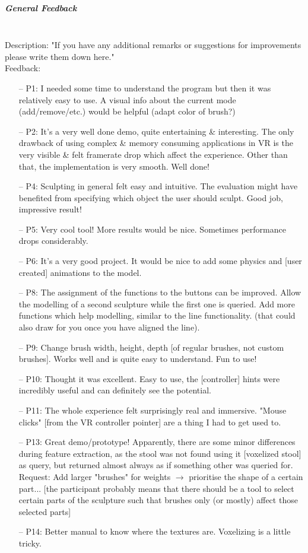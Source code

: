 \subparagraph{General Feedback} \hfill \\
Description: "If you have any additional remarks or suggestions for improvements please write them down here."\\
Feedback:
\begin{enumerate} \setlength\itemsep{-0.5em}
	\item[--] P1: I needed some time to understand the program but then it was relatively easy to use. A visual info about the current mode (add/remove/etc.) would be helpful (adapt color of brush?)
	\item[--] P2: It's a very well done demo, quite entertaining \& interesting. The only drawback of using complex \& memory consuming applications in VR is the very visible \& felt framerate drop which affect the experience. Other than that, the implementation is very smooth. Well done!
	\item[--] P4: Sculpting in general felt easy and intuitive. The evaluation might have benefited from specifying which object the user should sculpt. Good job, impressive result!
	\item[--] P5: Very cool tool! More results would be nice. Sometimes performance drops considerably.
	\item[--] P6: It's a very good project. It would be nice to add some physics and [user created] animations to the model.
	\item[--] P8: The assignment of the functions to the buttons can be improved. Allow the modelling of a second sculpture while the first one is queried. Add more functions which help modelling, similar to the line functionality. (that could also draw for you once you have aligned the line).
	\item[--] P9: Change brush width, height, depth [of regular brushes, not custom brushes]. Works well and is quite easy to understand. Fun to use!
	\item[--] P10: Thought it was excellent. Easy to use, the [controller] hints were incredibly useful and can definitely see the potential.
	\item[--] P11: The whole experience felt surprisingly real and immersive. "Mouse clicks" [from the VR controller pointer] are a thing I had to get used to.
	\item[--] P13: Great demo/prototype! Apparently, there are some minor differences during feature extraction, as the stool was not found using it [voxelized stool] as query, but returned almost always as if something other was queried for. Request: Add larger "brushes" for weights $\rightarrow$ prioritise the shape of a certain part... [the participant probably means that there should be a tool to select certain parts of the sculpture such that brushes only (or mostly) affect those selected parts]
	\item[--] P14: Better manual to know where the textures are. Voxelizing is a little tricky.
\end{enumerate}